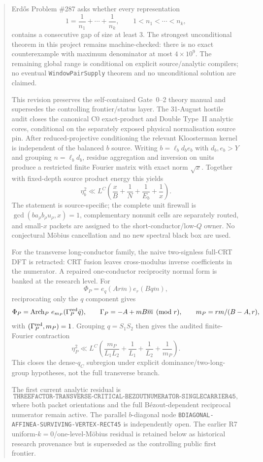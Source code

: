 \documentclass[11pt]{article}
\theoremstyle{definition}
\newcommand{\1}{\mathbf 1}
\begin{document}
\begin{abstract}
Erd\H{o}s Problem \#287 asks whether every representation
\[
1=\frac1{n_1}+\cdots+\frac1{n_k},\qquad 1<n_1<\cdots<n_k,
\]
contains a consecutive gap of size at least $3$. The strongest unconditional theorem in
this project remains machine-checked: there is no exact counterexample with maximum
denominator at most $4\times10^9$. The remaining global range is conditional on explicit
source/analytic compilers; no eventual \texttt{WindowPairSupply} theorem and no
unconditional solution are claimed.

This revision preserves the self-contained Gate~0--2 theory manual and supersedes the
controlling frontier/status layer. The 31-August hostile audit closes the canonical C0
exact-product and Double Type~II analytic cores, conditional on the separately exposed
physical normalisation source pin. After reduced-projective conditioning the relevant
Kloosterman kernel is independent of the balanced $b$ source. Writing
$b=\ell_b d_b e_b$ with $d_b,e_b>Y$ and grouping $n=\ell_bd_b$, residue aggregation and
inversion on units produce a restricted finite Fourier matrix with exact norm $\sqrt{x}$.
Together with fixed-depth source product energy this yields
\[
\eta_b^2\ll L^C\left(\frac{x}{B}+\frac1N+\frac1{E_b}+\frac1x\right).
\]
The statement is source-specific; the complete unit firewall is
$\gcd(b a_\rho b_\rho u_\rho,x)=1$, complementary nonunit cells are separately routed, and
small-$x$ packets are assigned to the short-conductor/low-$Q$ owner. No conjectural
M\"obius cancellation and no new spectral black box are used.

For the transverse long-conductor family, the naive two-signless full-CRT DFT is retracted:
CRT fusion leaves cross-modulus inverse coefficients in the numerator. A repaired
one-conductor reciprocity normal form is banked at the research level. For
\[
\Phi_P=e_q(A\overline{rm})e_r(B\overline{qm}),
\]
reciprocating only the $q$ component gives
\[
\Phi_P=\operatorname{Arch}_P\,e_{m_P}(\Gamma_P^{\rm red}\bar q),\qquad
\Gamma_P=-A+mB\overline m\pmod r,\qquad
m_P=rm/(B-A,r),
\]
with $(\Gamma_P^{\rm red},m_P)=1$. Grouping $q=S_1S_2$ then gives the audited finite-Fourier
contraction
\[
\eta_P^2\ll L^C\left(\frac{m_P}{L_1L_2}+\frac1{L_1}+\frac1{L_2}+\frac1{m_P}\right).
\]
This closes the dense-$q_C$ subregion under explicit dominance/two-long-group hypotheses,
not the full transverse branch.

The first current analytic residual is
\[
\boxed{\texttt{THREEFACTOR-TRANSVERSE-CRITICAL-BEZOUTNUMERATOR-SINGLECARRIER45}},
\]
where both packet orientations and the full B\'ezout-dependent reciprocal numerator remain
active. The parallel $b$-diagonal node
\texttt{BDIAGONAL-AFFINEA-SURVIVING-VERTEX-RECT45} is independently open. The earlier R7
uniform-$k=0$/one-level-M\"obius residual is retained below as historical research
provenance but is superseded as the controlling public first frontier.


\end{abstract}
\end{document}
